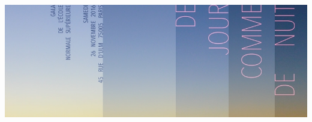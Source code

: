 \documentclass[a4paper,11pt,poets,durations]{ConcProg}
\begin{document}
\begin{center}
\includegraphics[scale=0.3]{logoNuit.jpg}
\end{center}
\end{document}
